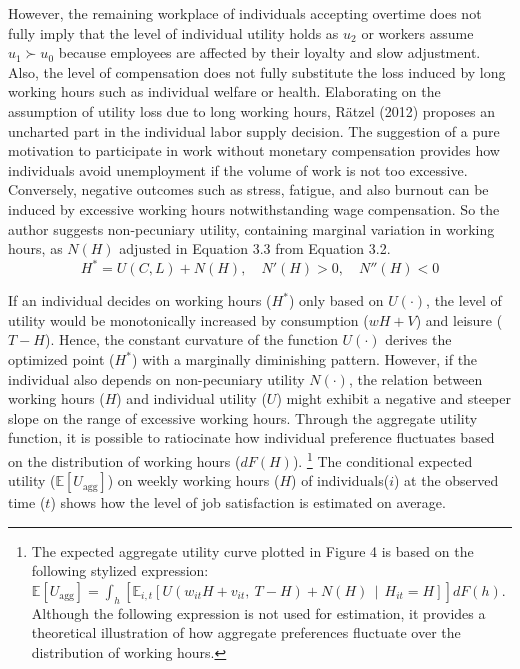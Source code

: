 \documentclass[
  12pt,
]{article}
\begin{document}
However, the remaining workplace of individuals accepting overtime does
not fully imply that the level of individual utility holds as \(u_2\) or
workers assume \(u_1 \succ u_0\) because employees are affected by their
loyalty and slow adjustment. Also, the level of compensation does not
fully substitute the loss induced by long working hours such as
individual welfare or health. Elaborating on the assumption of utility
loss due to long working hours, Rätzel (2012) proposes an uncharted part
in the individual labor supply decision. The suggestion of a pure
motivation to participate in work without monetary compensation provides
how individuals avoid unemployment if the volume of work is not too
excessive. Conversely, negative outcomes such as stress, fatigue, and
also burnout can be induced by excessive working hours notwithstanding
wage compensation. So the author suggests non-pecuniary utility,
containing marginal variation in working hours, as \(N(H)\) adjusted in
Equation 3.3 from Equation 3.2. \[
H^* = U(C,L) +N(H), \quad N'(H)>0, \quad N''(H)<0
\tag{3.3}
\]

If an individual decides on working hours (\(H^*\)) only based on
\(U(\cdot)\), the level of utility would be monotonically increased by
consumption (\(wH+V\)) and leisure (\(T-H\)). Hence, the constant
curvature of the function \(U(\cdot)\) derives the optimized point
(\(H^*\)) with a marginally diminishing pattern. However, if the
individual also depends on non-pecuniary utility \(N(\cdot)\), the
relation between working hours (\(H\)) and individual utility (\(U\))
might exhibit a negative and steeper slope on the range of excessive
working hours. Through the aggregate utility function, it is possible to
ratiocinate how individual preference fluctuates based on the
distribution of working hours (\(dF(H)\)). \footnote{The expected
  aggregate utility curve plotted in Figure 4 is based on the following
  stylized expression:
  \(\mathbb{E}[U_{\text{agg}}] = \int_h \left[ \mathbb{E}_{i,t} \left[ U(w_{it} H + v_{it},\ T - H) + N(H) \,\middle|\, H_{it} = H \right] \right] dF(h)\).
  Although the following expression is not used for estimation, it
  provides a theoretical illustration of how aggregate preferences
  fluctuate over the distribution of working hours.} The conditional
expected utility (\(\mathbb{E}[U_{\text{agg}}]\)) on weekly working
hours (\(H\)) of individuals(\(i\)) at the observed time (\(t\)) shows
how the level of job satisfaction is estimated on average.
\end{document}
